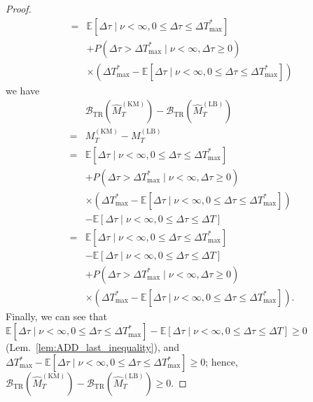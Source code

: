 \documentclass[10pt,a4paper]{amsart}
\def\mbe{\mathbb{E}}
\def\nn{\nonumber \\ }
\begin{document}
\begin{proof}
\begin{align}
        =& \mbe[ \Delta \tau \mid \nu < \infty, 0 \leq \Delta \tau \leq \Delta T_\mathrm{max}^*] \nn
            &+  P(\Delta \tau > \Delta T_\mathrm{max}^* \mid \nu < \infty, \Delta \tau \geq 0) \nn 
            &\times (\Delta T_\mathrm{max}^* - \mbe[ \Delta \tau \mid \nu < \infty,  0 \leq \Delta \tau \leq \Delta T_\mathrm{max}^*])
    \end{align}
    we have 
    \begin{align}
        &\mathcal{B}_\mathrm{TR}(\hat{M}_T^\mathrm{(KM)}) - \mathcal{B}_\mathrm{TR}(\hat{M}_T^\mathrm{(LB)}) \nn
        =&  M_T^{\mathrm{(KM)}}  - M_T^{\mathrm{(LB)}} \\
        =& \mbe[ \Delta \tau \mid \nu < \infty, 0 \leq  \Delta \tau \leq \Delta T_\mathrm{max}^*] \nn
            &+  P(\Delta \tau > \Delta T_\mathrm{max}^* \mid \nu < \infty, \Delta \tau \geq 0) \nn
            &\times (\Delta T_\mathrm{max}^* - \mbe[ \Delta \tau \mid \nu < \infty, 0 \leq  \Delta \tau \leq \Delta T_\mathrm{max}^*]) \nn
            &- \mbe[\Delta \tau \mid \nu < \infty, 0 \leq \Delta \tau \leq \Delta T] \\
        =& \mbe[ \Delta \tau \mid \nu < \infty, 0 \leq \Delta \tau \leq \Delta T_\mathrm{max}^*] \nn
            &- \mbe[\Delta \tau \mid \nu < \infty, 0 \leq \Delta \tau \leq \Delta T] \nn
            &+  P(\Delta \tau > \Delta T_\mathrm{max}^* \mid \nu < \infty, \Delta \tau \geq 0) \nn 
            &\times (\Delta T_\mathrm{max}^* - \mbe[ \Delta \tau \mid \nu < \infty, 0 \leq  \Delta \tau \leq \Delta T_\mathrm{max}^*]). 
    \end{align}
        Finally, we can see that 
        $\mbe[ \Delta \tau \mid \nu < \infty, 0 \leq \Delta \tau \leq \Delta  T_\mathrm{max}^*] 
        - \mbe[\Delta \tau \mid \nu < \infty, 0 \leq \Delta \tau \leq \Delta T] 
        \geq 0$ (Lem.~\ref{lem:ADD_last_inequality}), and
        $\Delta T_\mathrm{max}^* - \mbe[ \Delta \tau \mid \nu < \infty, 0 \leq \Delta \tau \leq \Delta T_\mathrm{max}^*] \geq 0$;
        hence, $\mathcal{B}_\mathrm{TR}(\hat{M}_T^\mathrm{(KM)}) - \mathcal{B}_\mathrm{TR}(\hat{M}_T^\mathrm{(LB)}) \geq 0$.

\end{proof}
\end{document}
